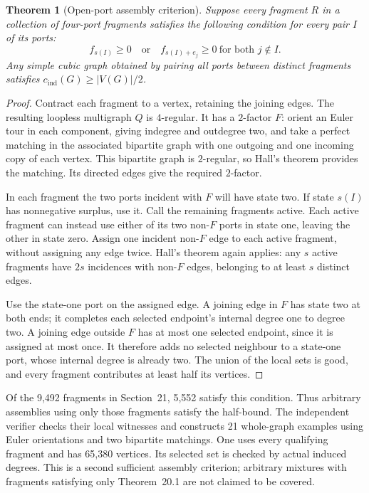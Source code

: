 \documentclass[11pt]{article}
\newtheorem{theorem}{Theorem}[section]
\newcommand{\cind}{c_{\mathrm{ind}}}
\begin{document}
\begin{theorem}[Open-port assembly criterion]\label{thm:open-port-assembly}
Suppose every fragment $R$ in a collection of four-port fragments
satisfies the following condition for every pair $I$ of its ports:
\[
 f_{s(I)}\geq0
 \quad\text{or}\quad
 f_{s(I)+e_j}\geq0\ \text{for both }j\notin I.
\]
Any simple cubic graph obtained by pairing all ports between
distinct fragments satisfies $\cind(G)\geq |V(G)|/2$.
\end{theorem}
\begin{proof}
Contract each fragment to a vertex, retaining the joining edges.
The resulting loopless multigraph $Q$ is $4$-regular. It has a
$2$-factor $F$: orient an Euler tour in each component, giving
indegree and outdegree two, and take a perfect matching in the
associated bipartite graph with one outgoing and one incoming copy
of each vertex. This bipartite graph is $2$-regular, so Hall's theorem
provides the matching. Its directed edges give the required $2$-factor.

In each fragment the two ports incident with $F$ will have state two.
If state $s(I)$ has nonnegative surplus, use it. Call the remaining
fragments active. Each active fragment can instead use either of
its two non-$F$ ports in state one, leaving the other in state zero.
Assign one incident non-$F$ edge to each active fragment, without
assigning any edge twice. Hall's theorem again applies: any $s$
active fragments have $2s$ incidences with non-$F$ edges, belonging
to at least $s$ distinct edges.

Use the state-one port on the assigned edge. A joining edge in $F$
has state two at both ends; it completes each selected endpoint's
internal degree one to degree two. A joining edge outside $F$ has
at most one selected endpoint, since it is assigned at most once.
It therefore adds no selected neighbour to a state-one port, whose
internal degree is already two. The union of the local sets is good,
and every fragment contributes at least half its vertices.
\end{proof}

Of the 9,492 fragments in Section~21, 5,552 satisfy this condition.
Thus arbitrary assemblies using only those fragments satisfy the
half-bound. The independent verifier checks their local witnesses
and constructs 21 whole-graph examples using Euler orientations and
two bipartite matchings. One uses every qualifying fragment and has
65,380 vertices. Its selected set is checked by actual induced
degrees. This is a second sufficient assembly criterion; arbitrary
mixtures with fragments satisfying only Theorem~20.1 are not claimed
to be covered.
\end{document}
